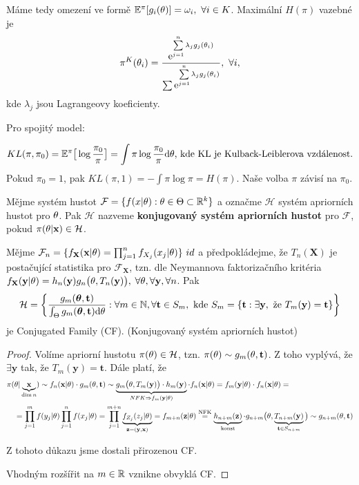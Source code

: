 
Máme tedy omezení ve formě $\mathbb{E}^\pi[g_i(\theta)]=\omega_i,~\forall i\in K$. Maximální $H(\pi)$ vazebné je $$\pi^K(\theta_i)=\frac{\mathrm{e}^{\sum\limits_{j=1}^{n} \lambda_j g_j(\theta_i)}}{\sum \mathrm{e}^{\sum\limits_{j=1}^{n} \lambda_jg_j(\theta_i)}},~\forall i,$$
kde $\lambda_j$ jsou Lagrangeovy koeficienty.

Pro spojitý model:

$$ KL(\pi,\pi_0)=\mathbb{E}^\pi\big[\log\frac{\pi_0}{\pi}\big]=\int\pi\log\frac{\pi_0}{\pi}\mathrm{d}\theta \text{, kde KL je Kulback-Leiblerova vzdálenost}.$$
Pokud $\pi_0=1$, pak $KL(\pi,1)=-\int\pi\log\pi=H(\pi)$. Naše volba $\pi$ závisí na $\pi_0$.

\begin{define}
	Mějme systém hustot $\mathcal{F}=\{f(x|\theta):\theta\in\Theta\subset\mathbb{R}^k\}$ a označme $\mathcal{H}$ systém apriorních hustot pro $\theta$. Pak $\mathcal{H}$ nazveme \textbf{konjugovaný systém apriorních hustot} pro $\mathcal{F}$, pokud $\pi(\theta|\textbf{x})\in\mathcal{H}$.
\end{define}
\begin{theorem}
	Mějme $\mathcal{F}_n=\{f_{\textbf{X}}(\textbf{x}|\theta)=\prod_{j=1}^n f_{X_j}(x_j|\theta)\} ~id$ a předpokládejme, že $T_n(\textbf{X})$ je postačující statistika pro $\mathcal{F}_\textbf{X}$, tzn. dle Neymannova faktorizačního kritéria $f_{\textbf{X}}(\textbf{y}|\theta)=h_n(\textbf{y})g_n\big(\theta,T_n(\textbf{y})\big),$ $\forall\theta,\forall\textbf{y},\forall n$. Pak $$\mathcal{H}=\bigg\{\frac{g_m(\boldsymbol{\theta},\textbf{t})}{\int_{\Theta} g_m(\boldsymbol{\theta},\textbf{t})\mathrm{d}\theta}:\forall m\in\mathbb{N},\forall\textbf{t}\in S_m,\text{ kde }S_m=\{\textbf{t}:\exists\textbf{y},\text{ že }T_m(\textbf{y})=\textbf{t}\}\bigg\}$$
	je Conjugated Family (CF). (Konjugovaný systém apriorních hustot)
	\begin{proof}
		Volíme apriorní hustotu $\pi(\theta)\in\mathcal{H}$, tzn. $\pi(\theta)\sim g_m(\theta,\textbf{t})$. Z toho vyplývá, že $\exists\textbf{y}$ tak, že $T_m(\textbf{y})=\textbf{t}$. Dále platí, že \[
		\begin{split}
		\pi(&\theta|\underbrace{\textbf{x}}_{\dim n})\sim f_n(\textbf{x}|\theta)\cdot g_m(\theta,\textbf{t})\sim \underbrace{g_m\big(\theta,T_m(\textbf{y})\big)\cdot h_m(\textbf{y})}_{NFK\Rightarrow f_m(\textbf{y}|\theta)}\cdot f_n(\textbf{x}|\theta)=f_m(\textbf{y}|\theta)\cdot f_n(\textbf{x}|\theta)=\\&=\prod_{j=1}^mf(y_j|\theta)\prod_{j=1}^nf(x_j|\theta)=\prod_{j=1}^{m+n}\underbrace{f_{Z_j}(z_j|\theta)}_{\textbf{z}=(\textbf{y},\textbf{x})}=f_{m+n}(\textbf{z}|\theta)\overset{\text{NFK}}{=}\underbrace{h_{n+m}(\textbf{z})}_{\text{konst}}\cdot g_{n+m}\big(\theta,\underbrace{T_{n+m}(\textbf{y})}_{\textbf{t}\in S_{n+m}}\big)\sim g_{n+m}(\theta,\textbf{t})
		\end{split}
		\]
		
		Z tohoto důkazu jsme dostali přirozenou CF.
		
		Vhodným rozšířit na $m\in\mathbb{R}$ vznikne obvyklá CF.
	\end{proof}
\end{theorem}

